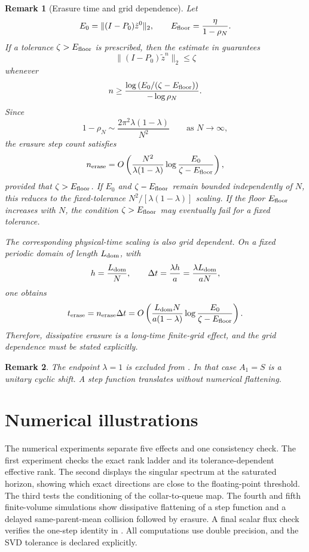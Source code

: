 \documentclass[preprint,12pt]{elsarticle}
\theoremstyle{plain}
\newtheorem{remark}{Remark}
\theoremstyle{remark}
\theoremstyle{definition}
\begin{document}
\begin{remark}[Erasure time and grid dependence]
\label{rem:erasure-time}
Let
\[
  E_0=\|(I-P_0)\tilde z^0\|_2,
  \qquad
  E_{\rm floor}=\frac{\eta}{1-\rho_N}.
\]
If a tolerance \(\zeta>E_{\rm floor}\) is prescribed, then the estimate in  guarantees
\[
  \|(I-P_0)\tilde z^n\|_2\le \zeta
\]
whenever
\[
  n
  \ge
  \frac{\log\left(E_0/(\zeta-E_{\rm floor})\right)}
       {-\log \rho_N}.
\]
Since
\[
  1-\rho_N
  \sim
  \frac{2\pi^2\lambda(1-\lambda)}{N^2}
  \qquad
  \text{as }N\to\infty,
\]
the erasure step count satisfies
\[
  n_{\rm erase}
  =
  O\left(
  \frac{N^2}{\lambda(1-\lambda)}
  \log\frac{E_0}{\zeta-E_{\rm floor}}
  \right),
\]
provided that \(\zeta>E_{\rm floor}\).  If \(E_0\) and \(\zeta-E_{\rm floor}\) remain bounded independently of \(N\), this reduces to the fixed-tolerance \(N^2/[\lambda(1-\lambda)]\) scaling.  If the floor \(E_{\rm floor}\) increases with \(N\), the condition \(\zeta>E_{\rm  floor}\) may eventually fail for a fixed tolerance.

The corresponding physical-time scaling is also grid dependent.  On a fixed periodic domain of length \(L_{\rm dom}\), with
\[
  h=\frac{L_{\rm dom}}{N},
  \qquad
  \Delta t=\frac{\lambda h}{a}
  =
  \frac{\lambda L_{\rm dom}}{aN},
\]
one obtains
\[
  t_{\rm erase}
  =
  n_{\rm erase}\Delta t
  =
  O\left(
  \frac{L_{\rm dom}N}{a(1-\lambda)}
  \log\frac{E_0}{\zeta-E_{\rm floor}}
  \right).
\]
Therefore, dissipative erasure is a long-time finite-grid effect, and the grid dependence must be stated explicitly.
\end{remark}

\begin{remark}
The endpoint \(\lambda=1\) is excluded from .  In that
case \(A_1=S\) is a unitary cyclic shift.  A step function translates without numerical flattening.
\end{remark}

\section{Numerical illustrations}
\label{sec:num_exp}

The numerical experiments separate five effects and one consistency check.
The first experiment checks the exact rank ladder and its tolerance-dependent
effective rank.  The second displays the singular spectrum at the saturated
horizon, showing which exact directions are close to the floating-point
threshold.  The third tests the conditioning of the collar-to-queue map.  The fourth and fifth finite-volume simulations show dissipative flattening of a step function and a delayed same-parent-mean collision followed by erasure.  A
final scalar flux check verifies the one-step identity in .  All computations use double precision, and the SVD tolerance is declared explicitly.
\end{document}
